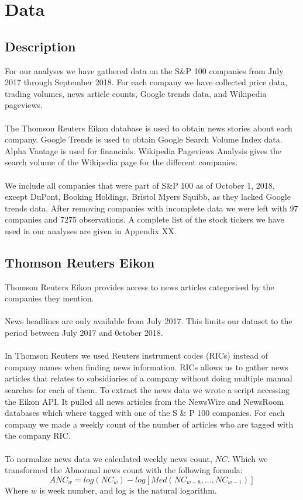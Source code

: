 
\chapter{Data}


\section{Description}
For our analyses we have gathered data on the  S\&P 100 companies from July 2017 through September 2018. For each company we have collected price data, trading volumes, news article counts, Google trends data, and Wikipedia pageviews.  
\\\\
The Thomson Reuters Eikon database is used to obtain news stories about each company. Google Trends is used to obtain Google Search Volume Index data. Alpha Vantage is used for financials. Wikipedia Pageviews Analysis gives the search volume of the Wikipedia page for the different companies. 
\\\\
We include all companies that were part of S\&P 100 as of October 1, 2018, except DuPont, Booking Holdings, Bristol Myers Squibb, as they lacked Google trends data. After removing companies with incomplete data we were left with 97 companies and 7275 observations. A complete list of the stock tickers we have used in our analyses are given in Appendix XX.


\section{Thomson Reuters Eikon}
Thomson Reuters Eikon provides access to news articles categorised by the companies they mention.
\\\\
News headlines are only available from July 2017. This limits our dataset to the period between July 2017 and 0ctober 2018.
\\\\
 In Thomson Reuters we used Reuters instrument codes (RICs) instead of company names when finding news information. RICs allows us to  gather news articles that relates to subsidiaries of a company without doing multiple manual searches for each of them. To extract the news data we wrote a script accessing the Eikon API. It pulled all news articles from the NewsWire and NewsRoom databases which where tagged with one of the S \& P 100 companies. For each company we made a weekly count of the number of articles who are tagged with the company RIC.
\\\\
To normalize news data we calculated weekly news count, $NC$. Which we transformed the Abnormal news count with the following formula:
\begin{equation}
   \label{abnormal_news} 
   ANC_{w} = log(NC_{w}) - log[Med(NC_{w-8},...,NC_{w-1})] 
\end{equation}
Where $w$ is week number, and log is the natural logarithm.
\\\\
